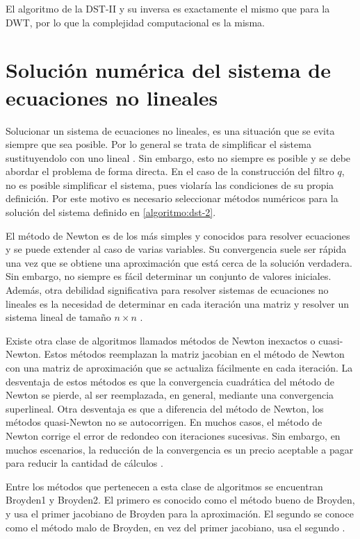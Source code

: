 El algoritmo de la DST-II y su inversa es exactamente el mismo que para la DWT, por lo que la complejidad computacional
es la misma.

\section{Solución numérica del sistema de ecuaciones no lineales}\label{numerical-solution}

Solucionar un sistema de ecuaciones no lineales, es una situación que se evita siempre que sea posible. Por lo general
se trata de simplificar el sistema sustituyendolo con uno lineal \cite{Burden2016}. Sin embargo, esto no siempre es posible y se debe abordar el problema de
forma directa. En el caso de la construcción del filtro $q$, no es posible simplificar el sistema, pues violaría
las condiciones de su propia definición. Por este motivo es necesario seleccionar métodos numéricos para la
solución del sistema definido en \ref{algoritmo:dst-2}.

El método de Newton es de los más simples y conocidos para resolver ecuaciones y se puede extender al caso de varias
variables. Su convergencia suele ser rápida una vez que se obtiene una aproximación que está cerca de la solución
verdadera. Sin embargo, no siempre es fácil determinar un conjunto de valores iniciales. Además, otra debilidad
significativa para resolver sistemas de ecuaciones no lineales es la necesidad de determinar en cada iteración 
una matriz y resolver un sistema lineal de tamaño $n\times n$ \cite{Burden2016}. 

Existe otra clase de algoritmos llamados métodos de Newton inexactos o cuasi-Newton. Estos métodos reemplazan la
matriz jacobian en el método de Newton con una matriz de aproximación que se actualiza fácilmente en 
cada iteración. La desventaja de estos métodos es que la convergencia cuadrática del método de Newton se pierde,
al ser reemplazada, en general, mediante una convergencia superlineal. Otra desventaja es que a diferencia 
del método de Newton, los métodos quasi-Newton no se autocorrigen. En muchos casos, el método de Newton
corrige el error de redondeo con iteraciones sucesivas. Sin embargo, en muchos escenarios, la reducción 
de la convergencia es un precio aceptable a pagar para reducir la cantidad de cálculos \cite{Burden2016}. 

Entre los métodos que pertenecen a esta clase de algoritmos se encuentran Broyden1 y Broyden2. El primero es conocido
como el método bueno de Broyden, y usa el primer jacobiano de Broyden para la aproximación. El segundo se conoce
como el método malo de Broyden, en vez del primer jacobiano, usa el segundo \cite{broyden}.

